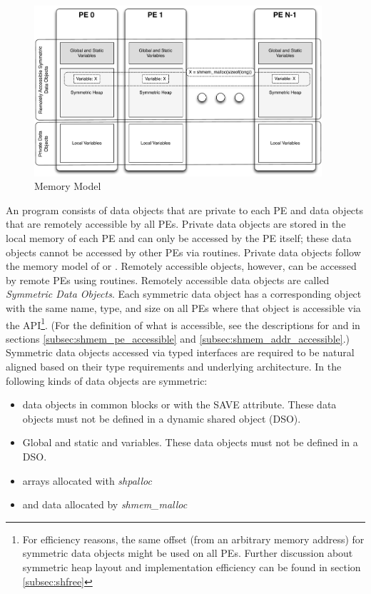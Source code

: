 \begin{figure}[h]
\includegraphics[width=0.95\textwidth]{figures/mem_model}      
\caption{\OSH Memory Model}                                   
\label{fig:mem_model}                                               
\end{figure}      
%
An \openshmem program consists of data objects that are private to each \ac{PE}
and data  objects that are remotely accessible by all \ac{PE}s. Private data
objects are stored in the local memory of each \ac{PE} and can only be accessed
by the \ac{PE} itself; these data objects cannot be accessed by other \ac{PE}s
via \openshmem routines. Private data objects follow the memory model of
\Clang{} or \Fortran. Remotely accessible objects, however, can be accessed by
remote \ac{PE}s using \openshmem routines.  Remotely accessible data objects are
called \emph{Symmetric Data Objects}.  Each symmetric data object has a
corresponding object with the same name, type, and size on all PEs where that object is
accessible via the \openshmem \ac{API}\footnote{For efficiency reasons,
the same offset (from an arbitrary memory address) for symmetric data
objects might be used on all \acp{PE}. Further discussion about symmetric heap
layout and implementation efficiency can be found in section
\ref{subsec:shfree}}.  (For the definition of what is accessible, see the
descriptions for  and 
in sections \ref{subsec:shmem_pe_accessible} and
\ref{subsec:shmem_addr_accessible}.) Symmetric data objects accessed via typed
\openshmem interfaces are required to be natural aligned based on their type
requirements and underlying architecture.  In \openshmem the following kinds of
data objects are symmetric:
%
\begin{itemize}
  \item \Fortran{} data objects in common blocks or with the  SAVE  attribute.
      These data objects must not be defined in a dynamic shared object (DSO).
  \item Global and static \Clang{} and \Cpp variables. These data objects must
      not  be defined in a DSO.
  \item \Fortran{} arrays allocated with \textit{shpalloc} 
  \item \Clang{} and \Cpp data allocated by \textit{shmem\_malloc}
\end{itemize}       

